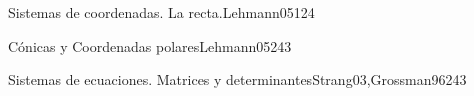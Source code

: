 \begin{syllabus}


\begin{justification}

\end{justification}

\begin{goals}
\item 
\item 
\end{goals}

\begin{outcomes}
    \item {}
    \item {}
\end{outcomes}

\begin{competences}
    \item {}
\end{competences}

\begin{unit}{Sistemas de coordenadas. La recta.}{Lehmann05}{12}{4}
   \begin{topics}
      \item 
      \item 
   \end{topics}
   \begin{unitgoals}
      \item 
   \end{unitgoals}
\end{unit}

\begin{unit}{Cónicas y Coordenadas polares}{Lehmann05}{24}{3}
   \begin{topics}
      \item 
      \item 
   \end{topics}

   \begin{unitgoals}
      \item 
      \item
      \item 
      \end{unitgoals}
\end{unit}

\begin{unit}{Sistemas de ecuaciones. Matrices y determinantes}{Strang03,Grossman96}{24}{3}
   \begin{topics}
      \item 
      \item 
      \item 
      \end{topics}


\end{unit}
\end{syllabus}
